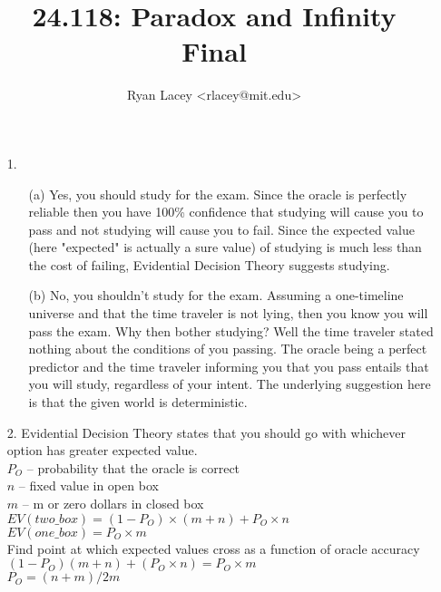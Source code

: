 \documentclass{article}
\begin{document}

\title{24.118: Paradox and Infinity\\Final}
\author{
  Ryan Lacey <rlacey@mit.edu>\\
}
        
\maketitle
        


\begin{enumerate}
\item[1.]
	\begin{enumerate}
	\item[(a)]
		Yes, you should study for the exam. Since the oracle is perfectly reliable then you have 100\% confidence that studying will cause you to pass and not studying will cause you to fail. Since the expected value (here "expected" is actually a sure value) of studying is much less than the cost of failing, Evidential Decision Theory suggests studying.\\
	\item[(b)]
		No, you shouldn't study for the exam. Assuming a one-timeline universe and that the time traveler is not lying, then you know you will pass the exam. Why then bother studying? Well the time traveler stated nothing about the conditions of you passing. The oracle being a perfect predictor and the time traveler informing you that you pass entails that you will study, regardless of your intent. The underlying suggestion here is that the given world is deterministic.
	\end{enumerate}

\newpage

\item[2.]
	Evidential Decision Theory states that you should go with whichever option has greater expected value. \\
	
	$P_O$ -- probability that the oracle is correct\\
	$n$ -- fixed value in open box\\
	$m$ -- m or zero dollars in closed box\\
	
	$EV(two\_box) = (1 - P_O) \times (m + n) + P_O \times n$\\
	$EV(one\_box) = P_O \times m$\\
	
	Find point at which expected values cross as a function of oracle accuracy\\
	$(1-P_O)(m+n)+(P_O \times n) = P_O \times m$\\
	$P_O = (n+m)/2m$\\
	

\end{enumerate}
\end{document}
